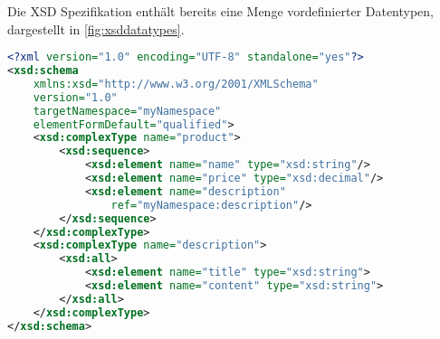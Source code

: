 Die XSD Spezifikation enthält bereits eine Menge vordefinierter Datentypen, dargestellt in \cref{fig:xsddatatypes}.

\begin{lstlisting}[language=XML, caption=Minimalbeispiel für eine Schemabeschreibung mit XSD, label=lst:minimalXSD]
<?xml version="1.0" encoding="UTF-8" standalone="yes"?>
<xsd:schema 
    xmlns:xsd="http://www.w3.org/2001/XMLSchema"
    version="1.0" 
    targetNamespace="myNamespace" 
    elementFormDefault="qualified">
    <xsd:complexType name="product">
        <xsd:sequence>
            <xsd:element name="name" type="xsd:string"/>
            <xsd:element name="price" type="xsd:decimal"/>
            <xsd:element name="description"
                ref="myNamespace:description"/>
        </xsd:sequence>
    </xsd:complexType>
    <xsd:complexType name="description">
        <xsd:all>
            <xsd:element name="title" type="xsd:string">
            <xsd:element name="content" type="xsd:string">
        </xsd:all>
    </xsd:complexType>
</xsd:schema>
\end{lstlisting}

%
%

